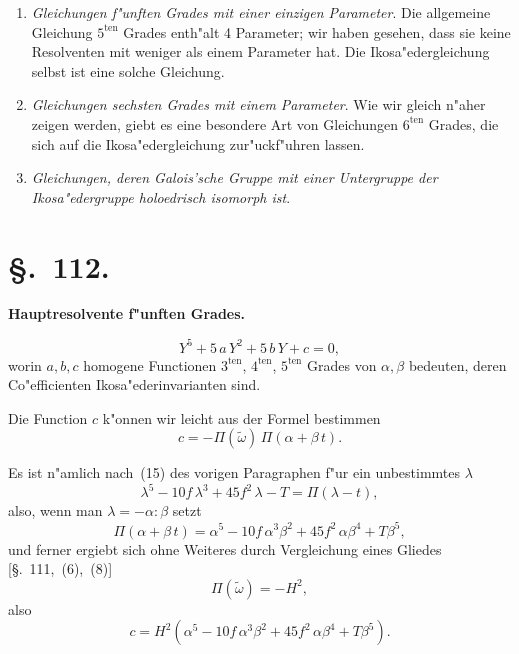 \documentclass[12pt,a4paper]{article}
\theoremstyle{plain}
\begin{document}
\begin{enumerate}[label=\textbf{\alph*)}]
\item \emph{Gleichungen f"unften Grades mit einer einzigen Parameter}. Die allgemeine Gleichung $5^{\text{ten}}$ Grades enth"alt 4 Parameter; wir haben gesehen, dass sie keine Resolventen mit weniger als einem Parameter hat. Die Ikosa"edergleichung selbst ist eine solche Gleichung.

\item \emph{Gleichungen sechsten Grades mit einem Parameter}. Wie wir gleich n"aher zeigen werden, giebt es eine besondere Art von Gleichungen $6^{\text{ten}}$ Grades, die sich auf die Ikosa"edergleichung zur"uckf"uhren lassen.

\item \emph{Gleichungen, deren Galois'sche Gruppe mit einer Untergruppe der Ikosa"edergruppe holoedrisch isomorph ist}.
\end{enumerate}

\section*{\S.~112.}
\begin{center}
\large\bfseries Hauptresolvente f"unften Grades.
\end{center}
\vspace{0.5em}

\begin{equation}\tag{2}
Y^5 + 5\,a\,Y^2 + 5\,b\,Y + c = 0,
\end{equation}
worin $a, b, c$ homogene Functionen $3^{\text{ten}}$, $4^{\text{ten}}$, $5^{\text{ten}}$ Grades von $\alpha, \beta$ bedeuten, deren Co"efficienten Ikosa"ederinvarianten sind.

Die Function $c$ k"onnen wir leicht aus der Formel bestimmen
\[c = -\Pi(\tilde{\omega})\,\Pi(\alpha + \beta\,t).\]

Es ist n"amlich nach~(15) des vorigen Paragraphen f"ur ein unbestimmtes $\lambda$
\[\lambda^5 - 10f\,\lambda^3 + 45f^2\,\lambda - T = \Pi(\lambda - t),\]
also, wenn man $\lambda = -\alpha : \beta$ setzt
\[\Pi(\alpha + \beta\,t) = \alpha^5 - 10f\,\alpha^3\beta^2 + 45f^2\,\alpha\beta^4 + T\beta^5,\]
und ferner ergiebt sich ohne Weiteres durch Vergleichung eines Gliedes [\S.~111,~(6),~(8)]
\[\Pi(\tilde{\omega}) = -H^2,\]
also
\begin{equation}\tag{3}
c = H^2(\alpha^5 - 10f\,\alpha^3\beta^2 + 45f^2\,\alpha\beta^4 + T\beta^5).
\end{equation}
\end{document}
